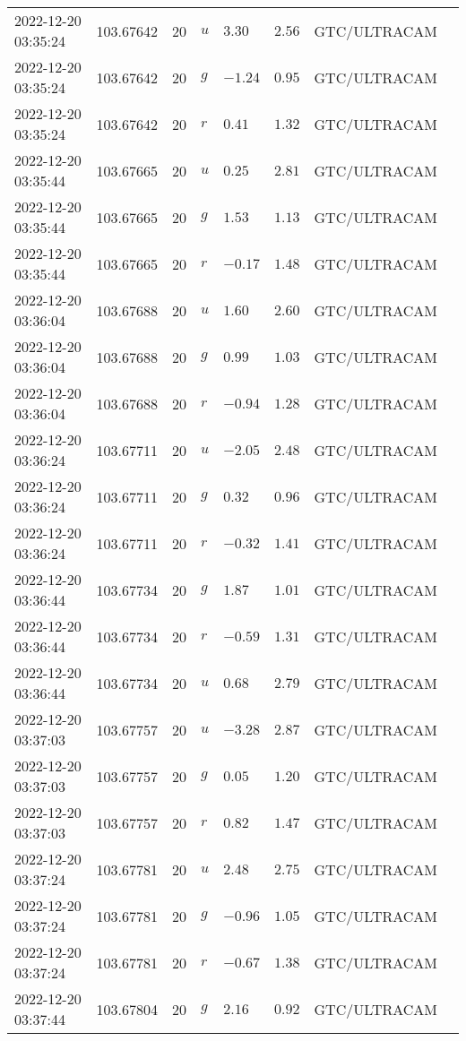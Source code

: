 \documentclass{nature_plusfigure}
\begin{document}
\begin{supplement}
\begin{center}
\begin{longtable}{llllllll}
2022-12-20 03:35:24 & 103.67642 & 20 & $u$ & $3.30$ & $2.56$ & GTC/ULTRACAM &  \\ 
2022-12-20 03:35:24 & 103.67642 & 20 & $g$ & $-1.24$ & $0.95$ & GTC/ULTRACAM &  \\ 
2022-12-20 03:35:24 & 103.67642 & 20 & $r$ & $0.41$ & $1.32$ & GTC/ULTRACAM &  \\ 
2022-12-20 03:35:44 & 103.67665 & 20 & $u$ & $0.25$ & $2.81$ & GTC/ULTRACAM &  \\ 
2022-12-20 03:35:44 & 103.67665 & 20 & $g$ & $1.53$ & $1.13$ & GTC/ULTRACAM &  \\ 
2022-12-20 03:35:44 & 103.67665 & 20 & $r$ & $-0.17$ & $1.48$ & GTC/ULTRACAM &  \\ 
2022-12-20 03:36:04 & 103.67688 & 20 & $u$ & $1.60$ & $2.60$ & GTC/ULTRACAM &  \\ 
2022-12-20 03:36:04 & 103.67688 & 20 & $g$ & $0.99$ & $1.03$ & GTC/ULTRACAM &  \\ 
2022-12-20 03:36:04 & 103.67688 & 20 & $r$ & $-0.94$ & $1.28$ & GTC/ULTRACAM &  \\ 
2022-12-20 03:36:24 & 103.67711 & 20 & $u$ & $-2.05$ & $2.48$ & GTC/ULTRACAM &  \\ 
2022-12-20 03:36:24 & 103.67711 & 20 & $g$ & $0.32$ & $0.96$ & GTC/ULTRACAM &  \\ 
2022-12-20 03:36:24 & 103.67711 & 20 & $r$ & $-0.32$ & $1.41$ & GTC/ULTRACAM &  \\ 
2022-12-20 03:36:44 & 103.67734 & 20 & $g$ & $1.87$ & $1.01$ & GTC/ULTRACAM &  \\ 
2022-12-20 03:36:44 & 103.67734 & 20 & $r$ & $-0.59$ & $1.31$ & GTC/ULTRACAM &  \\ 
2022-12-20 03:36:44 & 103.67734 & 20 & $u$ & $0.68$ & $2.79$ & GTC/ULTRACAM &  \\ 
2022-12-20 03:37:03 & 103.67757 & 20 & $u$ & $-3.28$ & $2.87$ & GTC/ULTRACAM &  \\ 
2022-12-20 03:37:03 & 103.67757 & 20 & $g$ & $0.05$ & $1.20$ & GTC/ULTRACAM &  \\ 
2022-12-20 03:37:03 & 103.67757 & 20 & $r$ & $0.82$ & $1.47$ & GTC/ULTRACAM &  \\ 
2022-12-20 03:37:24 & 103.67781 & 20 & $u$ & $2.48$ & $2.75$ & GTC/ULTRACAM &  \\ 
2022-12-20 03:37:24 & 103.67781 & 20 & $g$ & $-0.96$ & $1.05$ & GTC/ULTRACAM &  \\ 
2022-12-20 03:37:24 & 103.67781 & 20 & $r$ & $-0.67$ & $1.38$ & GTC/ULTRACAM &  \\ 
2022-12-20 03:37:44 & 103.67804 & 20 & $g$ & $2.16$ & $0.92$ & GTC/ULTRACAM &  \\ 

\end{longtable}
\end{center}
\end{supplement}
\end{document}
